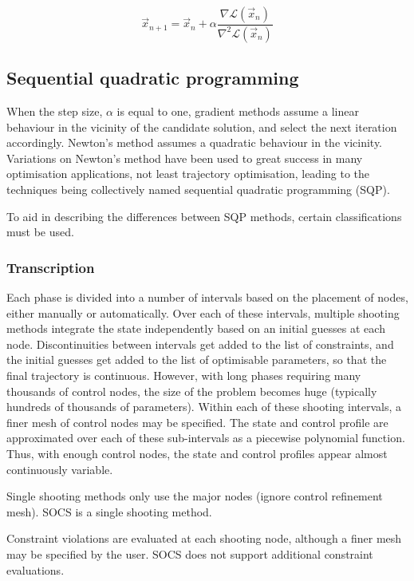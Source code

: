 \begin{equation} \label{eq:newtons-method}
\vec{x}_{n+1}=\vec{x}_n + \alpha\frac{\nabla\mathcal{L}(\vec{x}_n)}{\nabla^2\mathcal{L}(\vec{x}_n)}
\end{equation}

\subsection{Sequential quadratic programming} \label{sub:SQP}

When the step size, $\alpha$ is equal to one, gradient methods assume a linear behaviour in the vicinity of the candidate solution, and select the next iteration accordingly. Newton's method assumes a quadratic behaviour in the vicinity. Variations on Newton's method have been used to great success in many optimisation applications, not least trajectory optimisation, leading to the techniques being collectively named sequential quadratic programming (SQP). 

To aid in describing the differences between SQP methods, certain classifications must be used.



\subsubsection{Transcription}

Each phase is divided into a number of intervals based on the placement of nodes, either manually or automatically.
Over each of these intervals, multiple shooting methods integrate the state independently based on an initial guesses at each node. Discontinuities between intervals get added to the list of constraints, and the initial guesses get added to the list of optimisable parameters, so that the final trajectory is continuous. However, with long phases requiring many thousands of control nodes, the size of the problem becomes huge (typically hundreds of thousands of parameters). Within each of these shooting intervals, a finer mesh of control nodes may be specified. The state and control profile are approximated over each of these sub-intervals as a piecewise polynomial function. Thus, with enough control nodes, the state and control profiles appear almost continuously variable.

Single shooting methods only use the major nodes (ignore control refinement mesh). SOCS is a single shooting method.

Constraint violations are evaluated at each shooting node, although a finer mesh may be specified by the user. SOCS does not support additional constraint evaluations.


